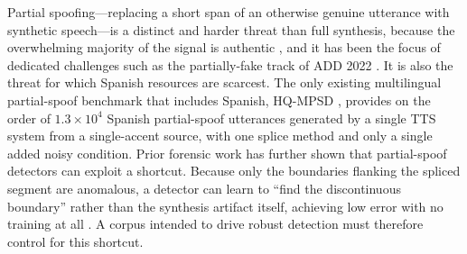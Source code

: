 \documentclass[11pt]{article}
\begin{document}
Partial spoofing---replacing a short span of an otherwise genuine utterance with synthetic speech---is a distinct and harder threat than full synthesis, because the overwhelming majority of the signal is authentic \citep{zhang2023partialspoof}, and it has been the focus of dedicated challenges such as the partially-fake track of ADD 2022 \citep{add2022}. It is also the threat for which Spanish resources are scarcest. The only existing multilingual partial-spoof benchmark that includes Spanish, HQ-MPSD \citep{li2025hqmpsd}, provides on the order of $1.3\times10^{4}$ Spanish partial-spoof utterances generated by a single TTS system from a single-accent source, with one splice method and only a single added noisy condition. Prior forensic work has further shown that partial-spoof detectors can exploit a shortcut. Because only the boundaries flanking the spliced segment are anomalous, a detector can learn to ``find the discontinuous boundary'' rather than the synthesis artifact itself, achieving low error with no training at all \citep{negroni2024splicing,huang2024detectable}. A corpus intended to drive robust detection must therefore control for this shortcut.
\end{document}
